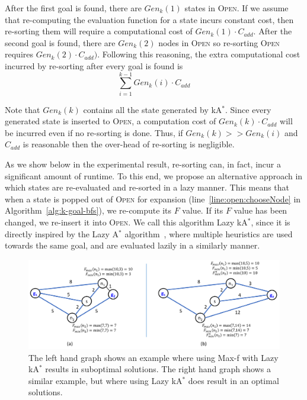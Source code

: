 \documentclass{aicom2e}
\newcommand{\astar}{A$^*$}
\newcommand{\kastar}{kA$^*$}
\newcommand{\maxf}{Max-f}
\newcommand{\open}{\textsc{Open}}
\begin{document}
After the first goal is found, there are $Gen_k(1)$ states in \open{}. If we assume that re-computing the evaluation function for a state incurs constant cost, then re-sorting them will require a computational cost of $Gen_k(1)\cdot C_{add}$. After the second goal is found, there are $Gen_k(2)$ nodes in \open{} so re-sorting \open{} requires $Gen_k(2)\cdot C_{add})$. Following this reasoning, the extra computational cost incurred by re-sorting after every goal is found is 
\begin{equation}  
\sum_{i=1}^{k-1} Gen_k(i)\cdot C_{add}
\label{eq:re-sort-cost}
\end{equation}

Note that $Gen_k(k)$ contains all the state generated by \kastar{}. Since every generated state is inserted to \open{}, a computation cost of $Gen_k(k)\cdot C_{add}$ will be incurred even if no re-sorting is done. 
Thus, if $Gen_k(k)>>Gen_k(i)$ and $C_{add}$ is reasonable then the over-head of re-sorting is negligible. 


As we show below in the experimental result, re-sorting can, in fact, incur a significant amount of runtime. To this end, we propose an alternative approach in which states are re-evaluated and re-sorted in a lazy manner. This means that when a state is popped out of \open{} for expansion (line~\ref{line:open:chooseNode} in Algorithm~\ref{alg:k-goal-bfs}), we re-compute its $F$ value. If its $F$ value has been changed, we re-insert it into \open{}. 
We call this algorithm Lazy \kastar{}, since it is directly inspired by the Lazy \astar{} algorithm~\cite{betzalel2015typeSystem,tolpin2013toward}, where multiple heuristics are used towards the same goal, and are evaluated lazily in a similarly manner.  


\begin{figure}
	\includegraphics[width=\textwidth]{Lazy_cropped.pdf}      
	\caption{The left hand graph shows an example where using \maxf{} with Lazy \kastar{} results in suboptimal solutions. The right hand graph shows a similar example, but where using Lazy \kastar{} does result in an optimal solutions.}
	\label{fig:lazy}
\end{figure}
\end{document}
